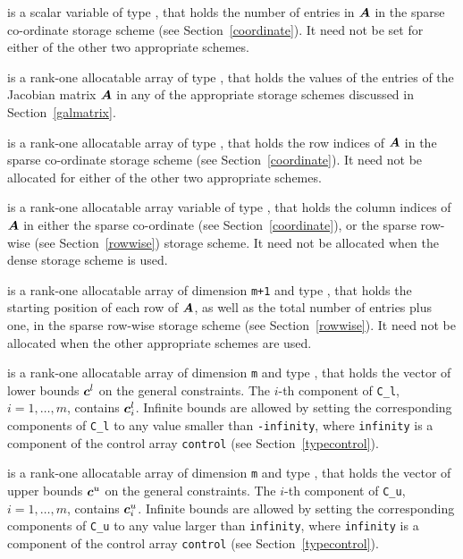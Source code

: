 \documentclass{galahad}
\begin{document}
\begin{description}
\begin{description}
 is a scalar variable of type \integer, that
holds the number of entries in ${\bm{A}}$
in the sparse co-ordinate storage scheme (see Section~\ref{coordinate}).
It need not be set for either of the other two appropriate schemes.

 is a rank-one allocatable array of type \realdp, that holds
the values of the entries of the Jacobian matrix ${\bm{A}}$ in any of the
appropriate storage schemes discussed in Section~\ref{galmatrix}.

 is a rank-one allocatable array of type \integer,
that holds the row indices of ${\bm{A}}$ in the sparse co-ordinate storage
scheme (see Section~\ref{coordinate}).
It need not be allocated for either of the other two appropriate schemes.

 is a rank-one allocatable array variable of type \integer,
that holds the column indices of ${\bm{A}}$ in either the sparse co-ordinate
(see Section~\ref{coordinate}), or the sparse row-wise
(see Section~\ref{rowwise}) storage scheme.
It need not be allocated when the dense storage scheme is used.

 is a rank-one allocatable array of dimension {\tt m+1} and type
\integer, that holds the
starting position of each row of ${\bm{A}}$, as well
as the total number of entries plus one, in the sparse row-wise storage
scheme (see Section~\ref{rowwise}). It need not be allocated when the
other appropriate schemes are used.

\end{description}

 is a rank-one allocatable array of dimension {\tt m} and type
\realdp, that holds the vector of lower bounds ${\bm{c}}^{l}$
on the general constraints. The $i$-th component of
{\tt C\_l}, $i = 1, \ldots , m$, contains ${\bm{c}}_{i}^{l}$.
Infinite bounds are allowed by setting the corresponding
components of {\tt C\_l} to any value smaller than {\tt -infinity},
where {\tt infinity} is a component of the control array {\tt control}
(see Section~\ref{typecontrol}).

 is a rank-one allocatable array of dimension {\tt m} and type
\realdp, that holds the vector of upper bounds ${\bm{c}}^{u}$
on the general constraints. The $i$-th component of
{\tt C\_u}, $i = 1,  \ldots ,  m$, contains ${\bm{c}}_{i}^{u}$.
Infinite bounds are allowed by setting the corresponding
components of {\tt C\_u} to any value larger than {\tt infinity},
where {\tt infinity} is a component of the control array {\tt control}
(see Section~\ref{typecontrol}).


\end{description}
\end{document}
